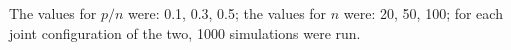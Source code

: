 The values for $p/n$ were: 0.1, 0.3, 0.5; the values for $n$ were: 20, 50, 100; for each joint configuration of the two, 1000 simulations were run.
